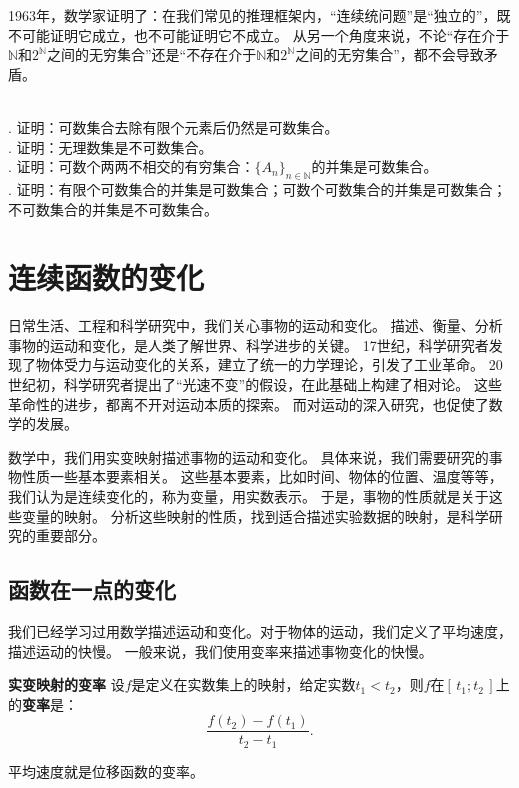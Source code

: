 \documentclass[12pt,UTF8,fontset=none]{ctexbook}
\begin{document}
1963年，数学家证明了：在我们常见的推理框架内，“连续统问题”是“独立的”，既不可能证明它成立，也不可能证明它不成立。
从另一个角度来说，不论“存在介于$\mathbb{N}$和$2^\mathbb{N}$之间的无穷集合”还是“不存在介于$\mathbb{N}$和$2^\mathbb{N}$之间的无穷集合”，都不会导致矛盾。

\begin{xt}
    \mbox{} \\
    . 证明：可数集合去除有限个元素后仍然是可数集合。\\
    . 证明：无理数集是不可数集合。\\
    . 证明：可数个两两不相交的有穷集合：$\{A_n\}_{n\in\mathbb{N}}$的并集是可数集合。\\
    . 证明：有限个可数集合的并集是可数集合；可数个可数集合的并集是可数集合；不可数集合的并集是不可数集合。
\end{xt}

\chapter{连续函数的变化}

日常生活、工程和科学研究中，我们关心事物的运动和变化。
描述、衡量、分析事物的运动和变化，是人类了解世界、科学进步的关键。
17世纪，科学研究者发现了物体受力与运动变化的关系，建立了统一的力学理论，引发了工业革命。
20世纪初，科学研究者提出了“光速不变”的假设，在此基础上构建了相对论。
这些革命性的进步，都离不开对运动本质的探索。
而对运动的深入研究，也促使了数学的发展。

数学中，我们用实变映射描述事物的运动和变化。
具体来说，我们需要研究的事物性质一些基本要素相关。
这些基本要素，比如时间、物体的位置、温度等等，我们认为是连续变化的，称为变量，用实数表示。
于是，事物的性质就是关于这些变量的映射。
分析这些映射的性质，找到适合描述实验数据的映射，是科学研究的重要部分。

\section{函数在一点的变化}
我们已经学习过用数学描述运动和变化。对于物体的运动，我们定义了平均速度，描述运动的快慢。
一般来说，我们使用变率来描述事物变化的快慢。
\begin{df}{\textbf{实变映射的变率}}
    设$f$是定义在实数集上的映射，给定实数$t_1 < t_2$，则$f$在$[\,t_1;t_2\,]$上的\textbf{变率}是：
    $$ \frac{f(t_2) - f(t_1)}{t_2 - t_1}.$$
\end{df}

平均速度就是位移函数的变率。
\end{document}
